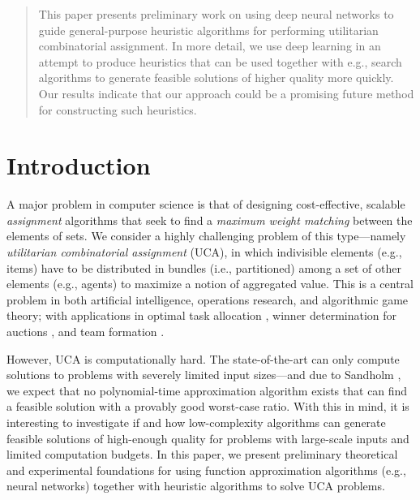 \documentclass[runningheads]{llncs}
\begin{document}
	\begin{abstract}
		This paper presents preliminary work on using deep neural networks to guide general-purpose heuristic algorithms for performing utilitarian combinatorial assignment. In more detail, we use deep learning in an attempt to produce heuristics that can be used together with e.g., search algorithms to generate feasible solutions of higher quality more quickly. Our results indicate that our approach could be a promising future method for constructing such heuristics.
		
		
		
	\end{abstract}
	\section{Introduction}
	A major problem in computer science is that of designing cost-effective, scalable \emph{assignment} algorithms that seek to find a \emph{maximum weight matching} between the elements of sets.  We consider a highly challenging problem of this type---namely \emph{utilitarian combinatorial assignment} (UCA), in which indivisible elements (e.g., items) have to be distributed in bundles (i.e., partitioned) among a set of other elements (e.g., agents) to maximize a notion of aggregated value. This is a central problem in both artificial intelligence, operations research, and algorithmic game theory; with applications in optimal task allocation \cite{prantare2017simultaneous}, winner determination for auctions \cite{sandholm2002winner}, and team formation \cite{prantare2020anytime}.
	
	However, UCA is computationally hard. The state-of-the-art can only compute solutions to problems with severely limited input sizes---and due to Sandholm \cite{sandholm2002algorithm}, we expect that no polynomial-time approximation algorithm exists that can find a feasible solution with a provably good worst-case ratio. With this in mind, it is interesting to investigate if and how low-complexity algorithms can generate feasible solutions of high-enough quality for problems with large-scale inputs and limited computation budgets. In this paper, we present preliminary theoretical and experimental foundations for using function approximation algorithms (e.g., neural networks) together with heuristic algorithms to solve UCA problems. %
	
\end{document}
